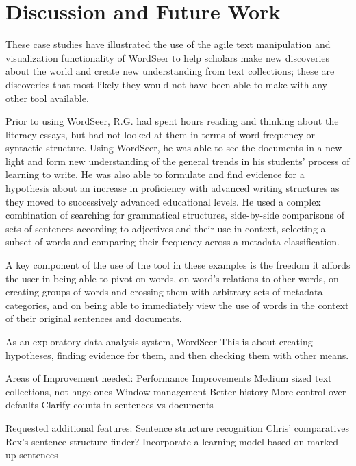 




\section{Discussion and Future Work}

These case studies have illustrated the use of the agile text manipulation and visualization functionality of WordSeer to help scholars make new discoveries about the world and create new understanding from text collections; these are discoveries that most likely they would not have been able to make with any other tool available.



Prior to using WordSeer, R.G. had spent hours reading and thinking about the literacy essays, but had not looked at them in terms of word frequency or syntactic structure.  Using WordSeer, he was able to see the documents in a new light and form new  understanding of the general trends in his students' process of learning to write.   He was also able to formulate and find evidence for a hypothesis about an increase in proficiency with advanced writing structures as they moved to successively advanced educational levels.   He used a complex combination of searching for grammatical structures, side-by-side comparisons of sets of sentences according to adjectives and their use in context, selecting a subset of words and comparing their frequency across a metadata classification.

A key component of the use of the tool in these examples is the freedom it affords the user in being able to pivot on words, on word's relations to other words, on creating groups of words and crossing them with arbitrary sets of metadata categories, and on being able to immediately view the use of words in the context of their original sentences and documents.

As an exploratory data analysis system, WordSeer
This is about creating hypotheses, finding evidence for them, and then checking them with other means.


Areas of Improvement needed:
	Performance Improvements
	Medium sized text collections, not huge ones
	Window management
	Better history
	More control over defaults
	Clarify counts in sentences vs documents
	
Requested additional features:
	Sentence structure recognition
		Chris' comparatives
		Rex's sentence structure finder?
	Incorporate a learning model based on marked up sentences
	
